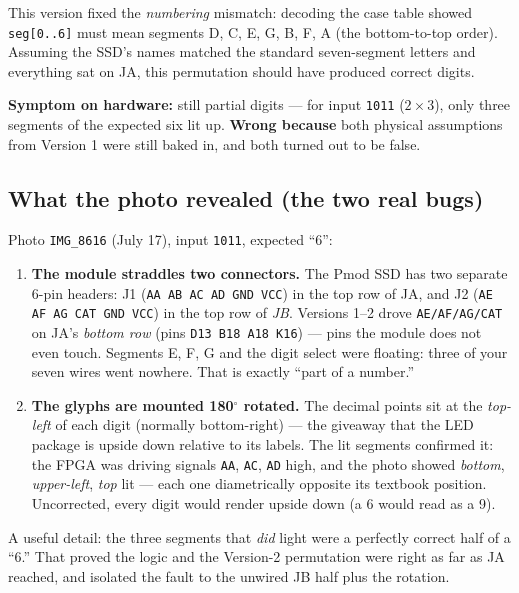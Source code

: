 \documentclass[11pt]{article}
\begin{document}
This version fixed the \emph{numbering} mismatch: decoding the case table
showed \texttt{seg[0..6]} must mean segments D, C, E, G, B, F, A (the
bottom-to-top order). Assuming the SSD's names matched the standard
seven-segment letters and everything sat on JA, this permutation should
have produced correct digits.

\textbf{Symptom on hardware:} still partial digits --- for input
\texttt{1011} ($2\times3$), only three segments of the expected six lit
up. \textbf{Wrong because} both physical assumptions from Version 1 were
still baked in, and both turned out to be false.

\subsection{What the photo revealed (the two real bugs)}

Photo \texttt{IMG\_8616} (July 17), input \texttt{1011}, expected ``6'':

\begin{enumerate}
  \item \textbf{The module straddles two connectors.} The Pmod SSD has
    two separate 6-pin headers: J1 (\texttt{AA AB AC AD GND VCC}) in the
    top row of JA, and J2 (\texttt{AE AF AG CAT GND VCC}) in the top row
    of \emph{JB}. Versions 1--2 drove \texttt{AE/AF/AG/CAT} on JA's
    \emph{bottom row} (pins \texttt{D13 B18 A18 K16}) --- pins the module
    does not even touch. Segments E, F, G and the digit select were
    floating: three of your seven wires went nowhere. That is exactly
    ``part of a number.''
  \item \textbf{The glyphs are mounted 180$^\circ$ rotated.} The decimal
    points sit at the \emph{top-left} of each digit (normally
    bottom-right) --- the giveaway that the LED package is upside down
    relative to its labels. The lit segments confirmed it: the FPGA was
    driving signals \texttt{AA}, \texttt{AC}, \texttt{AD} high, and the
    photo showed \emph{bottom}, \emph{upper-left}, \emph{top} lit ---
    each one diametrically opposite its textbook position. Uncorrected,
    every digit would render upside down (a 6 would read as a 9).
\end{enumerate}

A useful detail: the three segments that \emph{did} light were a
perfectly correct half of a ``6.'' That proved the logic and the
Version-2 permutation were right as far as JA reached, and isolated the
fault to the unwired JB half plus the rotation.
\end{document}
